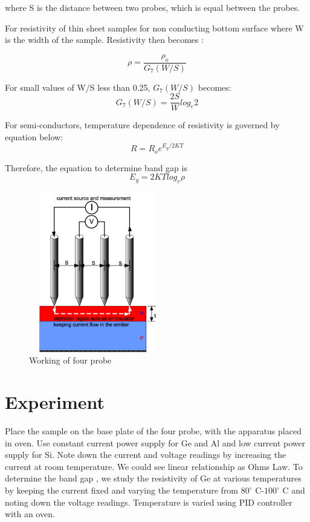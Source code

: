 \documentclass[a4paper, amsfonts, amssymb, amsmath, reprint, showkeys, nofootinbib, twoside]{revtex4-1}
\begin{document}
where S is the distance between two probes, which is equal between the probes.

For resistivity of thin sheet samples for non conducting bottom surface where W is the width of the sample. Resistivity then becomes :

\begin{equation}
	\rho=\frac{\rho_o}{G_7(W/S)}
\end{equation}

For small values of W/S less than 0.25, ${G_7(W/S)}$ becomes:
\begin{equation}
	{G_7(W/S)}=\frac{2S}{W}log_e2
\end{equation}

For semi-conductors, temperature dependence of resistivity is governed by equation below:
  \begin{equation}
  	R=R_oe^{E_g/2KT}
  \end{equation}

Therefore, the equation to determine band gap is
\begin{equation}\label{w}
	E_g=2KTlog_e\rho
\end{equation}

\begin{figure}[H]
	\centering
	\includegraphics[width=6cm, height=7cm]{1}
	\caption{Working of four probe}
	\label{1}
\end{figure}

\section{Experiment}
Place the sample on the base plate of the four probe, with the apparatus placed in oven. Use constant current power supply for Ge and Al and low current power supply for Si. Note down the current and voltage readings by increasing the current at room temperature. We could see linear relationship as Ohms Law. To determine the band gap , we study the resistivity of Ge at various temperatures by keeping the current fixed and varying the temperature from $80^{\circ}$ C-$100^{\circ}$ C and noting down the voltage readings. Temperature is varied using PID controller with an oven.
\end{document}
